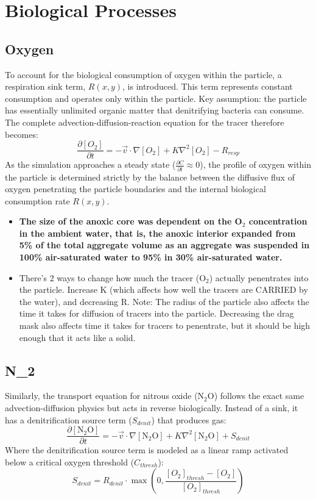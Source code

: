 \documentclass{article}
\begin{document}
\section{Biological Processes}
\subsection{Oxygen}
To account for the biological consumption of oxygen within the particle, a respiration sink term, $R(x,y)$, is introduced. This term represents constant consumption and operates only within the particle. Key assumption: the particle has essentially unlimited organic matter that denitrifying bacteria can consume. The complete advection-diffusion-reaction equation for the tracer therefore becomes:
\begin{equation}
    \frac{\partial [O_2]}{\partial t} = -\vec{v} \cdot \nabla [O_2] + K \nabla^2 [O_2] - R_{resp}
\end{equation}
As the simulation approaches a steady state ($\frac{\partial C}{\partial t} \approx 0$), the profile of oxygen within the particle is determined strictly by the balance between the diffusive flux of oxygen penetrating the particle boundaries and the internal biological consumption rate $R(x,y)$.

\begin{itemize}
    \item \textbf{The size of the anoxic core was dependent on the O$_2$ concentration in the ambient water, that is, the anoxic interior expanded from 5\% of the total aggregate volume as an aggregate was suspended in 100\% air-saturated water to 95\% in 30\% air-saturated water.}
    \item There's 2 ways to change how much the tracer (O$_2$) actually penentrates into the particle. Increase K (which affects how well the tracers are CARRIED by the water), and decreasing R. Note: The radius of the particle also affects the time it takes for diffusion of tracers into the particle. Decreasing the drag mask also affects time it takes for tracers to penentrate, but it should be high enough that it acts like a solid.
\end{itemize}


\subsection{N_2}

Similarly, the transport equation for nitrous oxide ($\text{N}_2\text{O}$) follows the exact same advection-diffusion physics but acts in reverse biologically. Instead of a sink, it has a denitrification source term ($S_{denit}$) that produces gas:
\begin{equation}
    \frac{\partial [\text{N}_2\text{O}]}{\partial t} = -\vec{v} \cdot \nabla [\text{N}_2\text{O}] + K \nabla^2 [\text{N}_2\text{O}] + S_{denit}
\end{equation}
Where the denitrification source term is modeled as a linear ramp activated below a critical oxygen threshold ($C_{thresh}$):
\begin{equation}
    S_{denit} = R_{denit} \cdot \max\left(0, \frac{[O_2]_{thresh} - [O_2]}{[O_2]_{thresh}}\right)
\end{equation}
\end{document}
